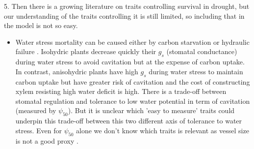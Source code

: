 \documentclass[a4paper,11pt]{article}
\begin{document}
5. Then there is a growing literature on traits controlling survival in drought, but our understanding of the traits controlling it is still limited, so including that in the model is not so easy.

\begin{itemize}
\item Water stress mortality can be caused either by carbon starvation or hydraulic failure \citep{McDowell-2008,McDowell-2011,Skelton-2015}. Isohydric plants decrease quickly their $g_s$ (stomatal conductance) during water stress to avoid cavitation but at the expense of carbon uptake. In contrast, anisohydric plants have high $g_s$ during water stress to maintain carbon uptake but have greater risk of cavitation and the cost of constructing xylem resisting high water deficit is high. There is a trade-off between stomatal regulation and tolerance to low water potential in term of cavitation (measured by $\psi_{50}$). But it is unclear which 'easy to measure' traits could underpin this trade-off between this two different axis of tolerance to water stress. Even for $\psi_{50}$ alone we don't know which traits is relevant as vessel size is not a good proxy \citep{Maherali-2004}. 
\end{itemize}





\clearpage



\end{document}
